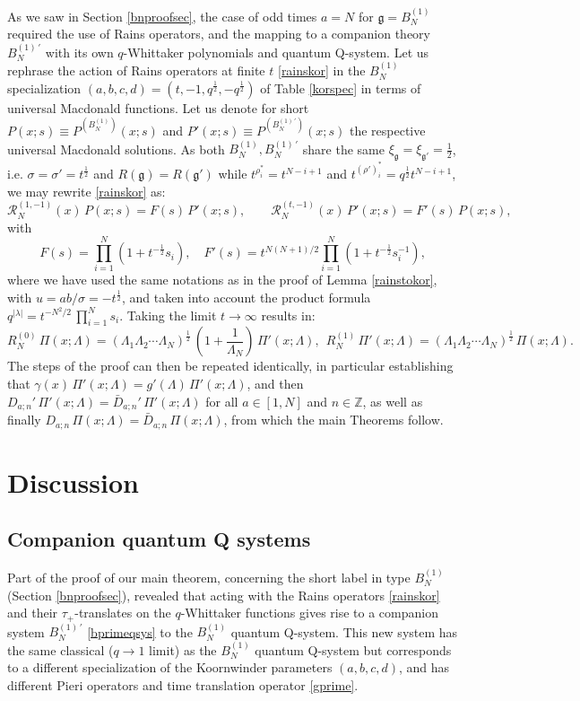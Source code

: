 \documentclass[12pt]{amsart}
\newcommand{\g}{{\mathfrak{g}}}
\newcommand{\Z}{{\mathbb Z}}
\newcommand{\lL}{{\Lambda}}
\newcommand{\half}{\frac{1}{2}}
\numberwithin{equation}{section}
\begin{document}
As we saw in Section \ref{bnproofsec}, the case of odd times $a=N$ for $\g=B_N^{(1)}$ required the use of Rains operators, and the mapping to
a companion theory $B_N^{(1)\, '}$ with its own $q$-Whittaker polynomials and quantum Q-system. Let us rephrase the action of Rains operators at finite $t$ \eqref{rainskor} in the $B_N^{(1)}$ specialization $(a,b,c,d)=(t,-1,q^\half,-q^\half)$ of Table \ref{korspec} in terms of universal Macdonald functions. Let us denote for short $P(x;s)\equiv P^{(B_N^{(1)})}(x;s)$ and $P'(x;s)\equiv P^{(B_N^{(1)\,'})}(x;s)$ the respective universal Macdonald solutions. As both $B_N^{(1)},B_N^{(1)\, '}$ share the same $\xi_\g=\xi_{\g'}=\half$, i.e. $\sigma=\sigma'=t^\half$ and $R(\g)=R(\g')$ while $t^{\rho^*_i}=t^{N-i+1}$ and $t^{(\rho')^*_i}=q^\half t^{N-i+1}$,
we may rewrite \eqref{rainskor} as:
$$ \mathcal R_N^{(1,-1)}(x) \, P(x;s)= F(s)\, P'(x;s), \qquad  \mathcal R_N^{(t,-1)}(x)\, P'(x;s)= F'(s)\, P(x;s), $$
with 
$$F(s)=\prod_{i=1}^N (1+t^{-\half} s_i),\quad F'(s)= t^{N(N+1)/2}\prod_{i=1}^N (1+t^{-\half} s_i^{-1}), $$
where we have used the same notations as in the proof of Lemma \ref{rainstokor}, with 
$u=ab/\sigma=-t^\half$, and taken into account the product formula $q^{|\lambda |}=t^{-N^2/2}\,\prod_{i=1}^N s_i$.
Taking the limit $t\to\infty$ results in:
$$R_N^{(0)} \, \Pi(x;\lL)= (\lL_1\lL_2\cdots \lL_N)^\half \,\left(1+\frac{1}{\lL_N}\right) \, \Pi'(x;\lL),
\ \ R_N^{(1)} \, \Pi'(x;\lL) =(\lL_1\lL_2\cdots \lL_N)^\half\, \Pi(x;\lL).$$
The steps of the proof can then be repeated identically, in particular establishing that 
$\gamma(x)\,\Pi'(x;\lL)=g'(\lL)\, \Pi'(x;\lL)$, and then $D_{a;n}'\, \Pi'(x;\lL)=\bar D_{a;n}'\, \Pi'(x;\lL)$ for all $a\in [1,N]$ and $n\in \Z$,
as well as finally $D_{a;n}\, \Pi(x;\lL)=\bar D_{a;n}\, \Pi(x;\lL)$, from which the main Theorems follow.




 
\section{Discussion}\label{sec:conclusion}
\subsection{Companion quantum Q systems}\label{sec:threenew}

%
Part of the proof of our main theorem, concerning the short label in type $B_N^{(1)}$ (Section \ref{bnproofsec}), revealed that acting with the Rains operators \eqref{rainskor} and their $\tau_+$-translates on the $q$-Whittaker functions gives rise to a companion system $B_N^{(1)\,'}$ \ref{bprimeqsys} to the $B_N^{(1)}$ quantum Q-system. This new system has the same classical ($q\to 1$ limit) as the $B_N^{(1)}$ quantum Q-system but corresponds to a different specialization of the Koornwinder parameters $(a,b,c,d)$, and has different Pieri operators and time translation operator \eqref{gprime}.
\end{document}
